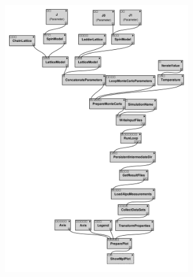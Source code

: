 \href{http://alps.comp-phys.org/vistrails/download.php?getvt=10&db=vistrails&host=alps.ethz.ch&port=3306&tag=&execute=False&showspreadsheetonly=False&embedWorkflow=False&version=169}{\includegraphics[width=8cm]{vistrails_images/alps.ethz.ch_vistrails_3306_10_169_pdf_graph/graph_10_169.pdf}
}